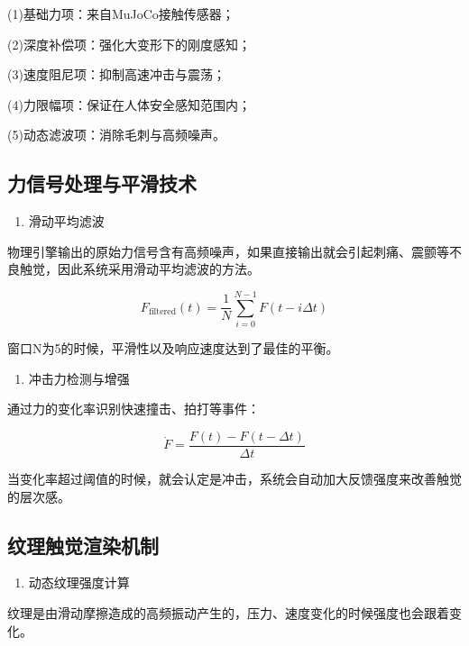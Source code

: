 (1)基础力项：来自MuJoCo接触传感器；

(2)深度补偿项：强化大变形下的刚度感知；

(3)速度阻尼项：抑制高速冲击与震荡；

(4)力限幅项：保证在人体安全感知范围内；

(5)动态滤波项：消除毛刺与高频噪声。

\subsection{力信号处理与平滑技术}

\begin{enumerate}
\def\labelenumi{\arabic{enumi}.}
\item
  滑动平均滤波
\end{enumerate}

物理引擎输出的原始力信号含有高频噪声，如果直接输出就会引起刺痛、震颤等不良触觉\cite{ref29}，因此系统采用滑动平均滤波的方法。

\begin{equation}
F_{\mathrm{filtered}}(t)=\frac{1}{N}\sum_{i=0}^{N-1}F(t-i\Delta t)
\end{equation}

窗口N为5的时候，平滑性以及响应速度达到了最佳的平衡。

\begin{enumerate}
\def\labelenumi{\arabic{enumi}.}
\setcounter{enumi}{1}
\item
  冲击力检测与增强
\end{enumerate}

通过力的变化率识别快速撞击、拍打等事件：

\begin{equation}
\dot{F}=\frac{F(t)-F(t-\Delta t)}{\Delta t}
\end{equation}

当变化率超过阈值的时候，就会认定是冲击，系统会自动加大反馈强度来改善触觉的层次感。

\subsection{纹理触觉渲染机制}

\begin{enumerate}
\def\labelenumi{\arabic{enumi}.}
\item
  动态纹理强度计算
\end{enumerate}

纹理是由滑动摩擦造成的高频振动产生的，压力、速度变化的时候强度也会跟着变化。

